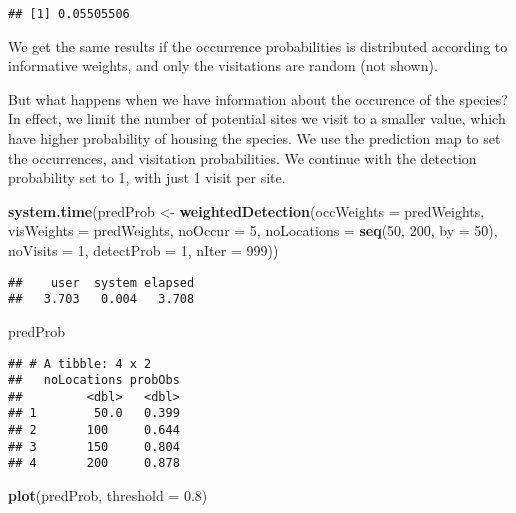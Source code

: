 \documentclass[]{article}
\newenvironment{Shaded}{\begin{snugshade}}{\end{snugshade}}
\newcommand{\KeywordTok}[1]{\textcolor[rgb]{0.13,0.29,0.53}{\textbf{#1}}}
\newcommand{\DataTypeTok}[1]{\textcolor[rgb]{0.13,0.29,0.53}{#1}}
\newcommand{\DecValTok}[1]{\textcolor[rgb]{0.00,0.00,0.81}{#1}}
\newcommand{\FloatTok}[1]{\textcolor[rgb]{0.00,0.00,0.81}{#1}}
\newcommand{\StringTok}[1]{\textcolor[rgb]{0.31,0.60,0.02}{#1}}
\newcommand{\NormalTok}[1]{#1}
\begin{document}
\begin{verbatim}
## [1] 0.05505506
\end{verbatim}

We get the same results if the occurrence probabilities is distributed
according to informative weights, and only the visitations are random
(not shown).

But what happens when we have information about the occurence of the
species? In effect, we limit the number of potential sites we visit to a
smaller value, which have higher probability of housing the species. We
use the prediction map to set the occurrences, and visitation
probabilities. We continue with the detection probability set to 1, with
just 1 visit per site.

\begin{Shaded}
\begin{Highlighting}[]
\KeywordTok{system.time}\NormalTok{(predProb <-}\StringTok{ }\KeywordTok{weightedDetection}\NormalTok{(}\DataTypeTok{occWeights =}\NormalTok{ predWeights, }\DataTypeTok{visWeights =}\NormalTok{ predWeights, }
    \DataTypeTok{noOccur =} \DecValTok{5}\NormalTok{, }\DataTypeTok{noLocations =} \KeywordTok{seq}\NormalTok{(}\DecValTok{50}\NormalTok{, }\DecValTok{200}\NormalTok{, }\DataTypeTok{by =} \DecValTok{50}\NormalTok{), }\DataTypeTok{noVisits =} \DecValTok{1}\NormalTok{, }\DataTypeTok{detectProb =} \DecValTok{1}\NormalTok{, }
    \DataTypeTok{nIter =} \DecValTok{999}\NormalTok{))}
\end{Highlighting}
\end{Shaded}

\begin{verbatim}
##    user  system elapsed 
##   3.703   0.004   3.708
\end{verbatim}

\begin{Shaded}
\begin{Highlighting}[]
\NormalTok{predProb}
\end{Highlighting}
\end{Shaded}

\begin{verbatim}
## # A tibble: 4 x 2
##   noLocations probObs
##         <dbl>   <dbl>
## 1        50.0   0.399
## 2       100     0.644
## 3       150     0.804
## 4       200     0.878
\end{verbatim}

\begin{Shaded}
\begin{Highlighting}[]
\KeywordTok{plot}\NormalTok{(predProb, }\DataTypeTok{threshold =} \FloatTok{0.8}\NormalTok{)}
\end{Highlighting}
\end{Shaded}
\end{document}
